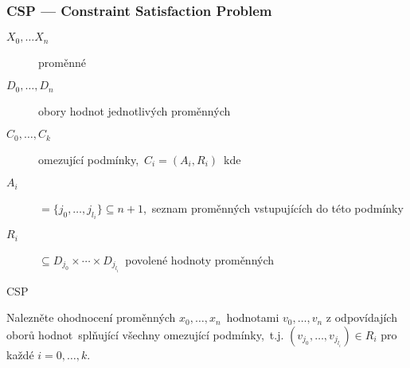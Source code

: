 \documentclass[red,professionalfont]{beamer}
\theoremstyle{definition}
\newcommand{\0}{\mbox{${\bf 0}$}}
\begin{document}
\begin{frame}\frametitle{CSP --- Constraint Satisfaction Problem}
\begin{description}
 \item[$X_0,\ldots X_n$] proměnné\pause
 \item[$D_0,\ldots,D_n$] obory hodnot jednotlivých proměnných\pause
 \item[$C_0,\ldots,C_k$] omezující podmínky,\pause\ $C_i = (A_i,R_i)$\pause\ kde
 \item[$A_i$] $=\{j_0,\ldots,j_{l_i}\}\subseteq n+1$,\pause\ seznam proměnných vstupujících do této podmínky\pause
 \item[$R_i$] $\subseteq D_{j_0}\times\cdots\times D_{j_{l_i}}$\pause\  povolené hodnoty proměnných\pause
\end{description}
\begin{center}
 CSP
\end{center}\pause
Nalezněte ohodnocení proměnných $x_0,\ldots,x_n$\pause\ hodnotami $v_0,\ldots,v_n$ z odpovídajích oborů hodnot\pause\ splňující
všechny omezující podmínky,\pause\ t.j. $(v_{j_0},\ldots,v_{j_{l_i}})\in R_i$ pro každé $i=0,\ldots,k$.
\end{frame}
\end{document}
